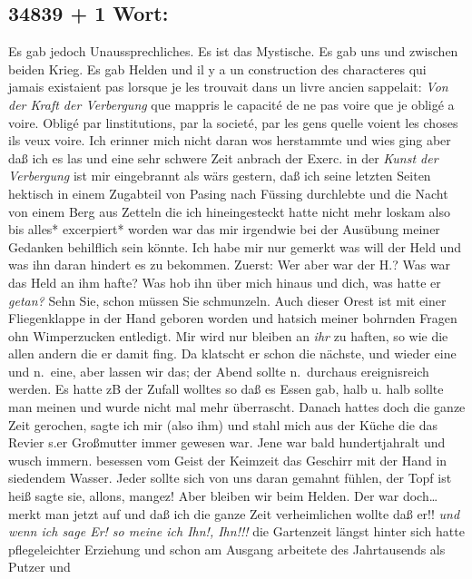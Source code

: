 \documentclass[
]{article}
\author{}
\date{\vspace{-2.5em}}
\begin{document}
\subsection{34839 + 1 Wort:}\label{wort}

Es gab jedoch Unaussprechliches. Es ist das Mystische. Es gab uns und
zwischen beiden Krieg. Es gab Helden und il y a un construction des
characteres qui jamais existaient pas lorsque je les trouvait dans un
livre ancien s\textquotesingle appelait: \emph{Von der Kraft der
Verbergung }que m\textquotesingle appris le capacité de ne pas voire que
je obligé a voire. Obligé par l\textquotesingle institutions, par la
societé, par les gens quelle voient les choses ils veux voire. Ich
erinner mich nicht daran wos herstammte und wies ging aber daß ich es
las und eine sehr schwere Zeit anbrach der Exerc. in der \emph{Kunst der
Verbergung} ist mir eingebrannt als wärs gestern, daß ich seine letzten
Seiten hektisch in einem Zugabteil von Pasing nach Füssing durchlebte
und die Nacht von einem Berg aus Zetteln die ich hineingesteckt hatte
nicht mehr loskam also bis alles* excerpiert* worden war das mir
irgendwie bei der Ausübung meiner Gedanken behilflich sein könnte. Ich
habe mir nur gemerkt was will der Held und was ihn daran hindert es zu
bekommen. Zuerst: Wer aber war der H.? Was war das Held an ihm hafte?
Was hob ihn über mich hinaus und dich, was hatte er \emph{getan?} Sehn
Sie, schon müssen Sie schmunzeln. Auch dieser Orest ist mit einer
Fliegenklappe in der Hand geboren worden und hatsich meiner bohrnden
Fragen ohn Wimperzucken entledigt. Mir wird nur bleiben an \emph{ihr} zu
haften, so wie die allen andern die er damit fing. Da klatscht er schon
die nächste, und wieder eine und n.~eine, aber lassen wir das; der Abend
sollte n.~durchaus ereignisreich werden. Es hatte zB der Zufall wolltes
so daß es Essen gab, halb u. halb sollte man meinen und wurde nicht mal
mehr überrascht. Danach hattes doch die ganze Zeit gerochen, sagte ich
mir (also ihm) und stahl mich aus der Küche die das Revier s.er
Großmutter immer gewesen war. Jene war bald hundertjahralt und wusch
immern. besessen vom Geist der Keimzeit das Geschirr mit der Hand in
siedendem Wasser. Jeder sollte sich von uns daran gemahnt fühlen, der
Topf ist heiß sagte sie, allons, mangez! Aber bleiben wir beim Helden.
Der war doch\ldots{} merkt man jetzt auf und daß ich die ganze Zeit
verheimlichen wollte daß er!! \emph{und wenn ich sage Er! so meine ich
Ihn!, Ihn!!! }die Gartenzeit längst hinter sich hatte pflegeleichter
Erziehung und schon am Ausgang arbeitete des Jahrtausends als Putzer und
\end{document}
